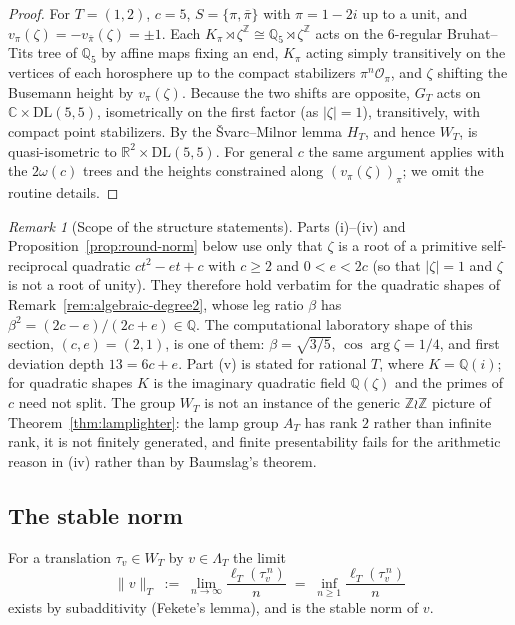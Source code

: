 \documentclass[11pt]{article}
\theoremstyle{plain}
\theoremstyle{definition}
\theoremstyle{remark}
\newtheorem{remark}[theorem]{Remark}
\newcommand{\Z}{\mathbb{Z}}
\newcommand{\Q}{\mathbb{Q}}
\newcommand{\R}{\mathbb{R}}
\newcommand{\C}{\mathbb{C}}
\begin{document}
\begin{proof}
For $T=(1,2)$, $c=5$, $S=\{\pi,\bar\pi\}$ with $\pi=1-2i$ up to a unit, and
$v_\pi(\zeta)=-v_{\bar\pi}(\zeta)=\pm1$. Each $K_\pi\rtimes\zeta^{\Z}\cong\Q_5\rtimes\zeta^{\Z}$
acts on the $6$-regular Bruhat--Tits tree of $\Q_5$ by affine maps fixing
an end, $K_\pi$ acting simply transitively on the vertices of each horosphere
up to the compact stabilizers $\pi^n\mathcal O_\pi$, and $\zeta$ shifting the
Busemann height by $v_\pi(\zeta)$. Because the two shifts are opposite, $G_T$
acts on $\C\times\mathrm{DL}(5,5)$, isometrically on the first factor (as
$|\zeta|=1$), transitively, with compact point stabilizers. By the
\v{S}varc--Milnor lemma $H_T$, and hence $W_T$, is quasi-isometric to
$\R^2\times\mathrm{DL}(5,5)$. For general $c$ the same argument applies with the
$2\omega(c)$ trees and the heights constrained along $(v_\pi(\zeta))_\pi$; we omit
the routine details.
\end{proof}

\begin{remark}[Scope of the structure statements]
\label{rem:WT-scope}
Parts (i)--(iv) and Proposition~\ref{prop:round-norm} below use only that
$\zeta$ is a root of a primitive self-reciprocal quadratic $ct^2-et+c$ with
$c\ge2$ and $0<e<2c$ (so that $|\zeta|=1$ and $\zeta$ is not a root of unity).
They therefore hold verbatim for the quadratic shapes of
Remark~\ref{rem:algebraic-degree2}, whose leg ratio $\beta$ has
$\beta^2=(2c-e)/(2c+e)\in\Q$. The computational laboratory shape of this
section, $(c,e)=(2,1)$, is one of them: $\beta=\sqrt{3/5}$, $\cos\arg\zeta=1/4$,
and first deviation depth $13=6c+e$. Part (v) is stated for rational $T$,
where $K=\Q(i)$; for quadratic shapes $K$ is the imaginary quadratic field
$\Q(\zeta)$ and the primes of $c$ need not split. The group $W_T$ is not an
instance of the generic $\Z\wr\Z$ picture of Theorem~\ref{thm:lamplighter}: the
lamp group $A_T$ has rank $2$ rather than infinite rank, it is not finitely
generated, and finite presentability fails for the arithmetic reason in (iv)
rather than by Baumslag's theorem.
\end{remark}

\subsection{The stable norm}

For a translation $\tau_v\in W_T$ by $v\in\Lambda_T$ the limit
\[
  \|v\|_T \;:=\; \lim_{n\to\infty}\frac{\ell_T(\tau_v^{\,n})}{n}
  \;=\;\inf_{n\ge1}\frac{\ell_T(\tau_v^{\,n})}{n}
\]
exists by subadditivity (Fekete's lemma), and is the stable norm of $v$.
\end{document}
